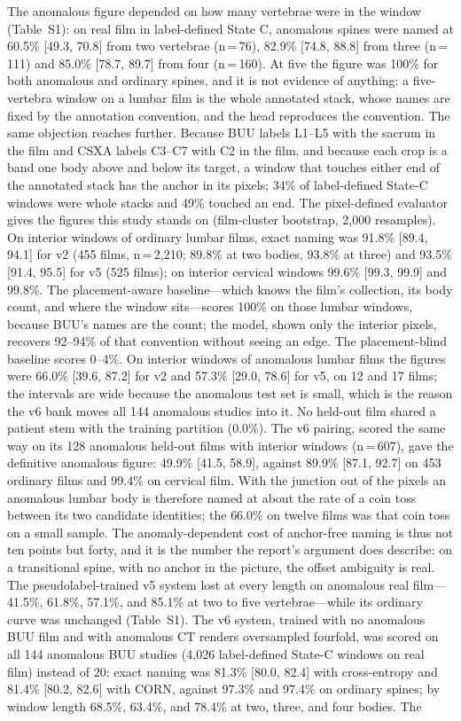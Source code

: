 \documentclass[11pt,letterpaper]{article}
\newcommand{\ci}[2]{[#1, #2]}
\begin{document}
The anomalous figure depended on how many vertebrae were in the window (Table~S1): on real film in label-defined State C, anomalous spines were named at 60.5\% \ci{49.3}{70.8} from two vertebrae (n\,=\,76), 82.9\% \ci{74.8}{88.8} from three (n\,=\,111) and 85.0\% \ci{78.7}{89.7} from four (n\,=\,160). At five the figure was 100\% for both anomalous and ordinary spines, and it is not evidence of anything: a five-vertebra window on a lumbar film is the whole annotated stack, whose names are fixed by the annotation convention, and the head reproduces the convention. The same objection reaches further. Because BUU labels L1--L5 with the sacrum in the film and CSXA labels C3--C7 with C2 in the film, and because each crop is a band one body above and below its target, a window that touches either end of the annotated stack has the anchor in its pixels; 34\% of label-defined State-C windows were whole stacks and 49\% touched an end. The pixel-defined evaluator gives the figures this study stands on (film-cluster bootstrap, 2,000 resamples). On interior windows of ordinary lumbar films, exact naming was 91.8\% \ci{89.4}{94.1} for v2 (455 films, n\,=\,2,210; 89.8\% at two bodies, 93.8\% at three) and 93.5\% \ci{91.4}{95.5} for v5 (525 films); on interior cervical windows 99.6\% \ci{99.3}{99.9} and 99.8\%. The placement-aware baseline---which knows the film's collection, its body count, and where the window sits---scores 100\% on those lumbar windows, because BUU's names are the count; the model, shown only the interior pixels, recovers 92--94\% of that convention without seeing an edge. The placement-blind baseline scores 0--4\%. On interior windows of anomalous lumbar films the figures were 66.0\% \ci{39.6}{87.2} for v2 and 57.3\% \ci{29.0}{78.6} for v5, on 12 and 17 films; the intervals are wide because the anomalous test set is small, which is the reason the v6 bank moves all 144 anomalous studies into it. No held-out film shared a patient stem with the training partition (0.0\%). The v6 pairing, scored the same way on its 128 anomalous held-out films with interior windows (n\,=\,607), gave the definitive anomalous figure: 49.9\% \ci{41.5}{58.9}, against 89.9\% \ci{87.1}{92.7} on 453 ordinary films and 99.4\% on cervical film. With the junction out of the pixels an anomalous lumbar body is therefore named at about the rate of a coin toss between its two candidate identities; the 66.0\% on twelve films was that coin toss on a small sample. The anomaly-dependent cost of anchor-free naming is thus not ten points but forty, and it is the number the report's argument does describe: on a transitional spine, with no anchor in the picture, the offset ambiguity is real. The pseudolabel-trained v5 system lost at every length on anomalous real film---41.5\%, 61.8\%, 57.1\%, and 85.1\% at two to five vertebrae---while its ordinary curve was unchanged (Table~S1). The v6 system, trained with no anomalous BUU film and with anomalous CT renders oversampled fourfold, was scored on all 144 anomalous BUU studies (4,026 label-defined State-C windows on real film) instead of 20: exact naming was 81.3\% \ci{80.0}{82.4} with cross-entropy and 81.4\% \ci{80.2}{82.6} with CORN, against 97.3\% and 97.4\% on ordinary spines; by window length 68.5\%, 63.4\%, and 78.4\% at two, three, and four bodies. The 
\end{document}
